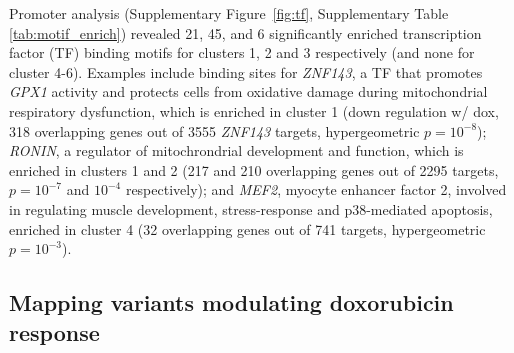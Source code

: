 \documentclass{article}
\begin{document}
Promoter analysis (Supplementary Figure~\ref{fig:tf}, Supplementary Table \ref{tab:motif_enrich}) revealed 21, 45, and 6 significantly enriched transcription factor (TF) binding motifs for clusters 1, 2 and 3 respectively (and none for cluster 4-6). Examples include binding sites for \emph{ZNF143}, a TF that promotes \emph{GPX1} activity and protects cells from oxidative damage during mitochondrial respiratory dysfunction\cite{Lu2012}, which is enriched in cluster 1 (down regulation w/ dox, 318 overlapping genes out of 3555 \emph{ZNF143} targets, hypergeometric $p=10^{-8}$); \emph{RONIN}, a regulator of mitochrondrial development and function\cite{Poche2016}, which is enriched in clusters 1 and 2 (217 and 210 overlapping genes out of 2295 targets, $p=10^{-7}$ and $10^{-4}$ respectively); and \emph{MEF2}, myocyte enhancer factor 2, involved in regulating muscle development, stress-response and p38-mediated apoptosis\cite{Zarubin2005}, enriched in cluster 4 (32 overlapping genes out of 741 targets, hypergeometric $p=10^{-3}$). 

\subsection*{Mapping variants modulating doxorubicin response}
\end{document}
